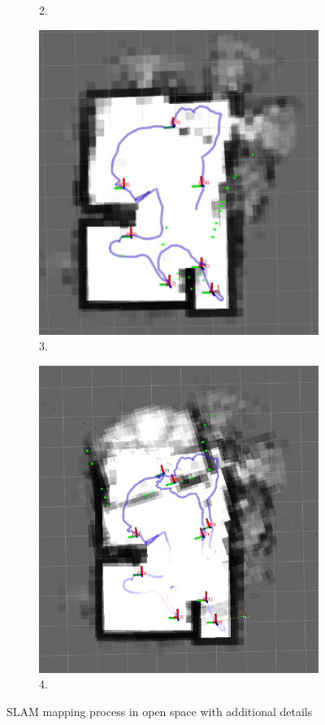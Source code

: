 \begin{figure}[ht!]
\begin{subfigure}[b]{0.4\linewidth}
      \caption{2.}
    \end{subfigure}
    \begin{subfigure}[b]{0.4\linewidth}
      \includegraphics[width=0.9\linewidth]{figures/building2_open_03.png}
      \caption{3.}
    \end{subfigure}
    \begin{subfigure}[b]{0.4\linewidth}
      \includegraphics[width=0.9\linewidth]{figures/building2_open_04.png}
      \caption{4.}
    \end{subfigure}
    \caption{SLAM mapping process in open space with additional details}
    \label{fig:slam_in_open_space}
\end{figure}













